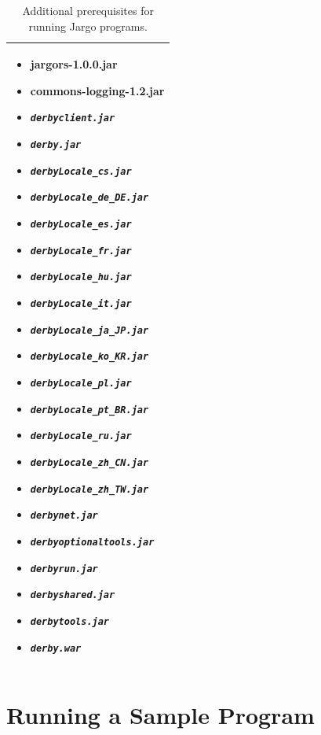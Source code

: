 \begin{table}
\small
\centering
\caption{Additional prerequisites for running Jargo programs.}
\label{tab:runtime}
\begin{tabular}{|p{}|}
\hline
\begin{itemize}
\item jargors-1.0.0.jar
\item commons-logging-1.2.jar
\item \textit{\texttt{derbyclient.jar}}
\item \textit{\texttt{derby.jar}}
\item \textit{\texttt{derbyLocale\_cs.jar}}
\item \textit{\texttt{derbyLocale\_de\_DE.jar}}
\item \textit{\texttt{derbyLocale\_es.jar}}
\item \textit{\texttt{derbyLocale\_fr.jar}}
\item \textit{\texttt{derbyLocale\_hu.jar}}
\item \textit{\texttt{derbyLocale\_it.jar}}
\item \textit{\texttt{derbyLocale\_ja\_JP.jar}}
\item \textit{\texttt{derbyLocale\_ko\_KR.jar}}
\item \textit{\texttt{derbyLocale\_pl.jar}}
\item \textit{\texttt{derbyLocale\_pt\_BR.jar}}
\item \textit{\texttt{derbyLocale\_ru.jar}}
\item \textit{\texttt{derbyLocale\_zh\_CN.jar}}
\item \textit{\texttt{derbyLocale\_zh\_TW.jar}}
\item \textit{\texttt{derbynet.jar}}
\item \textit{\texttt{derbyoptionaltools.jar}}
\item \textit{\texttt{derbyrun.jar}}
\item \textit{\texttt{derbyshared.jar}}
\item \textit{\texttt{derbytools.jar}}
\item \textit{\texttt{derby.war}}
\end{itemize}\\
\hline
\end{tabular}
\end{table}

\section{Running a Sample Program}

